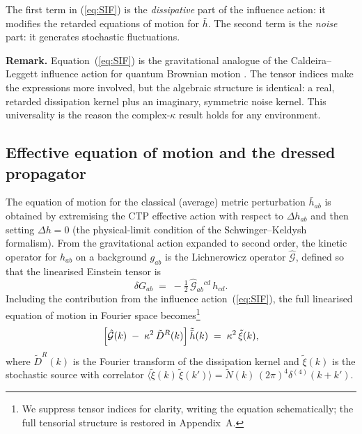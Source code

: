 \documentclass[12pt,a4paper]{article}
\begin{document}
\noindent
The first term in (\ref{eq:SIF}) is the \emph{dissipative} part of the influence action: it modifies the retarded equations of motion for $\bar{h}$.
The second term is the \emph{noise} part: it generates stochastic fluctuations.

\medskip

\noindent
\textbf{Remark.}
Equation~(\ref{eq:SIF}) is the gravitational analogue of the Caldeira--Leggett influence action for quantum Brownian motion \cite{CaldeiraLeggett1983}.
The tensor indices make the expressions more involved, but the algebraic structure is identical: a real, retarded dissipation kernel plus an imaginary, symmetric noise kernel.
This universality is the reason the complex-$\kappa$ result holds for any environment.

\subsection{Effective equation of motion and the dressed propagator}\label{sec:effeom}

The equation of motion for the classical (average) metric perturbation $\bar{h}_{ab}$ is obtained by extremising the CTP effective action with respect to $\Delta h_{ab}$ and then setting $\Delta h=0$ (the physical-limit condition of the Schwinger--Keldysh formalism).
From the gravitational action expanded to second order, the kinetic operator for $h_{ab}$ on a background $g_{ab}$ is the Lichnerowicz operator $\hat{\mathcal{G}}$, defined so that the linearised Einstein tensor is
\begin{equation}\label{eq:Lichnerowicz}
  \delta G_{ab} \;=\; -\tfrac{1}{2}\,\hat{\mathcal{G}}_{ab}{}^{cd}\,h_{cd}.
\end{equation}
Including the contribution from the influence action~(\ref{eq:SIF}), the full linearised equation of motion in Fourier space becomes\footnote{We suppress tensor indices for clarity, writing the equation schematically; the full tensorial structure is restored in Appendix~A.}
\begin{equation}\label{eq:eomfull}
  \Bigl[\hat{\mathcal{G}}(k) \;-\; \kappa^{2}\,\tilde{D}^{R}(k)\Bigr]\,\tilde{\bar{h}}(k)
  \;=\;
  \kappa^{2}\,\tilde{\xi}(k),
\end{equation}
where $\tilde{D}^{R}(k)$ is the Fourier transform of the dissipation kernel and $\tilde{\xi}(k)$ is the stochastic source with correlator $\langle\tilde{\xi}(k)\,\tilde{\xi}(k')\rangle = \tilde{N}(k)\,(2\pi)^{4}\delta^{(4)}(k+k')$.
\end{document}
